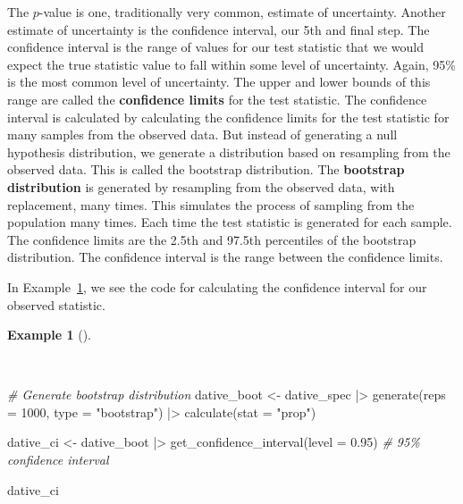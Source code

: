 \documentclass[
  letterpaper,
  krantz1]{latex/krantz-mod}
\newenvironment{Shaded}{\begin{snugshade}}{\end{snugshade}}
\newcommand{\AttributeTok}[1]{\textcolor[rgb]{0.00,0.00,0.00}{#1}}
\newcommand{\CommentTok}[1]{\textcolor[rgb]{0.00,0.00,0.00}{\textit{#1}}}
\newcommand{\DecValTok}[1]{\textcolor[rgb]{0.00,0.00,0.00}{#1}}
\newcommand{\FloatTok}[1]{\textcolor[rgb]{0.00,0.00,0.00}{#1}}
\newcommand{\FunctionTok}[1]{\textcolor[rgb]{0.00,0.00,0.00}{#1}}
\newcommand{\NormalTok}[1]{\textcolor[rgb]{0.00,0.00,0.00}{#1}}
\newcommand{\OtherTok}[1]{\textcolor[rgb]{0.00,0.00,0.00}{#1}}
\newcommand{\SpecialCharTok}[1]{\textcolor[rgb]{0.00,0.00,0.00}{#1}}
\newcommand{\StringTok}[1]{\textcolor[rgb]{0.00,0.00,0.00}{#1}}
\theoremstyle{definition}
\theoremstyle{definition}
\newtheorem{example}{Example}[chapter]
\theoremstyle{remark}
\begin{document}
The \(p\)-value is one, traditionally very common,
estimate of uncertainty. Another estimate of uncertainty is the
confidence interval, our 5th and final step. The confidence
interval is the range of values for our test
statistic that we would expect the true statistic value to fall within
some level of uncertainty. Again, 95\% is the most common level of
uncertainty. The upper and lower bounds of this range are called the
\textbf{confidence limits} for the test
statistic. The confidence interval is calculated by calculating the
confidence limits for the test statistic for many samples from the
observed data. But instead of generating a null hypothesis distribution,
we generate a distribution based on resampling from the observed data.
This is called the bootstrap distribution. The \textbf{bootstrap
distribution} is generated by resampling
from the observed data, with replacement, many times. This simulates the
process of sampling from the population many times. Each
time the test statistic is generated for each sample. The confidence
limits are the 2.5th and 97.5th percentiles of the bootstrap
distribution. The confidence interval is the range between the
confidence limits.

In Example~\ref{exm-infer-cat-confidence-interval}, we see the code for
calculating the confidence interval for our observed statistic.

\pagebreak

\begin{example}[]\protect\hypertarget{exm-infer-cat-confidence-interval}{}\label{exm-infer-cat-confidence-interval}

~

\begin{Shaded}
\begin{Highlighting}[numbers=left,,]
\CommentTok{\# Generate bootstrap distribution}
\NormalTok{dative\_boot }\OtherTok{\textless{}{-}}
\NormalTok{  dative\_spec }\SpecialCharTok{|\textgreater{}}
  \FunctionTok{generate}\NormalTok{(}\AttributeTok{reps =} \DecValTok{1000}\NormalTok{, }\AttributeTok{type =} \StringTok{"bootstrap"}\NormalTok{) }\SpecialCharTok{|\textgreater{}}
  \FunctionTok{calculate}\NormalTok{(}\AttributeTok{stat =} \StringTok{"prop"}\NormalTok{)}

\NormalTok{dative\_ci }\OtherTok{\textless{}{-}}
\NormalTok{  dative\_boot }\SpecialCharTok{|\textgreater{}}
  \FunctionTok{get\_confidence\_interval}\NormalTok{(}\AttributeTok{level =} \FloatTok{0.95}\NormalTok{) }\CommentTok{\# 95\% confidence interval}

\NormalTok{dative\_ci}
\end{Highlighting}
\end{Shaded}

\end{example}
\end{document}
